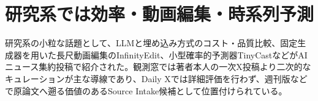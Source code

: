 \section{研究系では効率・動画編集・時系列予測}
研究系の小粒な話題として、LLMと埋め込み方式のコスト・品質比較、固定生成器を用いた長尺動画編集のInfinityEdit、小型確率的予測器TinyCastなどがAIニュース集約投稿で紹介された。観測窓では著者本人の一次X投稿より二次的なキュレーションが主な導線であり、Daily Xでは詳細評価を行わず、週刊版などで原論文へ遡る価値のあるSource Intake候補として位置付けられている。
